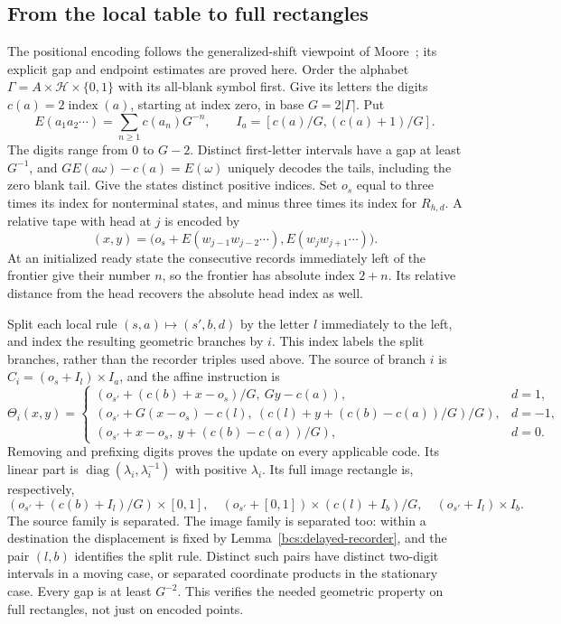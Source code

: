 \subsection{From the local table to full rectangles}
The positional encoding follows the generalized-shift viewpoint of Moore~\cite{Moore1990,Moore1991}; its explicit gap and endpoint estimates are proved here. Order the alphabet $\Gamma=A\times\mathcal H\times\{0,1\}$ with its all-blank symbol first. Give its letters the digits $c(a)=2\operatorname{index}(a)$, starting at index zero, in base $G=2|\Gamma|$. Put
\[
 E(a_1a_2\cdots)=\sum_{n\ge1}c(a_n)G^{-n},\qquad
 I_a=[c(a)/G,(c(a)+1)/G].
\]
The digits range from $0$ to $G-2$. Distinct first-letter intervals have a gap at least $G^{-1}$, and $GE(a\omega)-c(a)=E(\omega)$ uniquely decodes the tails, including the zero blank tail. Give the states distinct positive indices. Set $o_s$ equal to three times its index for nonterminal states, and minus three times its index for $R_{h,d}$. A relative tape with head at $j$ is encoded by
\[
 (x,y)=\bigl(o_s+E(w_{j-1}w_{j-2}\cdots),E(w_jw_{j+1}\cdots)\bigr).
\]
At an initialized ready state the consecutive records immediately left of the frontier give their number $n$, so the frontier has absolute index $2+n$. Its relative distance from the head recovers the absolute head index as well.

Split each local rule $(s,a)\mapsto(s',b,d)$ by the letter $l$ immediately to the left, and index the resulting geometric branches by $i$. This index labels the split branches, rather than the recorder triples used above. The source of branch $i$ is
$C_i=(o_s+I_l)\times I_a$, and the affine instruction is
\begin{equation}\label{bcs:scalar-branches}
 \Theta_i(x,y)=\begin{cases}
 (o_{s'}+(c(b)+x-o_s)/G,\ Gy-c(a)),&d=1,\\
 (o_{s'}+G(x-o_s)-c(l),\ (c(l)+y+(c(b)-c(a))/G)/G),&d=-1,\\
 (o_{s'}+x-o_s,\ y+(c(b)-c(a))/G),&d=0.
 \end{cases}
\end{equation}
Removing and prefixing digits proves the update on every applicable code. Its linear part is $\operatorname{diag}(\lambda_i,\lambda_i^{-1})$ with positive $\lambda_i$. Its full image rectangle is, respectively,
\[
 (o_{s'}+(c(b)+I_l)/G)\times[0,1],\quad
 (o_{s'}+[0,1])\times(c(l)+I_b)/G,\quad
 (o_{s'}+I_l)\times I_b.
\]
The source family is separated. The image family is separated too: within a destination the displacement is fixed by Lemma~\ref{bcs:delayed-recorder}, and the pair $(l,b)$ identifies the split rule. Distinct such pairs have distinct two-digit intervals in a moving case, or separated coordinate products in the stationary case. Every gap is at least $G^{-2}$. This verifies the needed geometric property on full rectangles, not just on encoded points.

